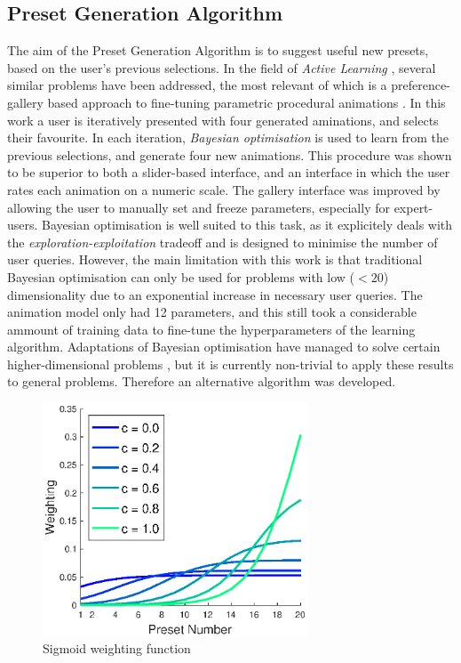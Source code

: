 \documentclass[11pt, oneside]{report}   	%
\begin{document}
\subsection{Preset Generation Algorithm} \label{sec:PresetGeneration}
The aim of the Preset Generation Algorithm is to suggest useful new presets, based on the user's previous selections. In the field of \emph{Active Learning} \cite{ActiveLearning}, several similar problems have been addressed, the most relevant of which is a preference-gallery based approach to fine-tuning parametric procedural animations \cite{PreferenceGallery}.
In this work a user is iteratively presented with four generated aminations, and selects their favourite. In each iteration, \emph{Bayesian optimisation} is used to learn from the previous selections, and generate four new animations. This procedure was shown to be superior to both a slider-based interface, and an interface in which the user rates each animation on a numeric scale. The gallery interface was improved by allowing the user to manually set and freeze parameters, especially for expert-users. Bayesian optimisation is well suited to this task, as it explicitely deals with the \emph{exploration-exploitation} tradeoff \cite{ExplorationExploitation} and is designed to minimise the number of user queries. However, the main limitation with this work is that traditional Bayesian optimisation can only be used for problems with low ($<20$) dimensionality due to an exponential increase in necessary user queries. The animation model only had 12 parameters, and this still took a considerable ammount of training data to fine-tune the hyperparameters of the learning algorithm.  Adaptations of Bayesian optimisation have managed to solve certain higher-dimensional problems \cite{BayesOptDimensionality}, but it is currently non-trivial to apply these results to general problems. Therefore an alternative algorithm was developed.
\begin{figure}
	\vspace{-10pt}
	\hspace{-31pt}
	\includegraphics[trim = {0, 0, 0, 0.5cm}, clip, width = 3.1in]{SigmoidWeights.eps}
	\caption{Sigmoid weighting function}
	\label{fig:SigmoidWeights}
	
	
	\vspace{40pt}
\end{figure}
\end{document}
